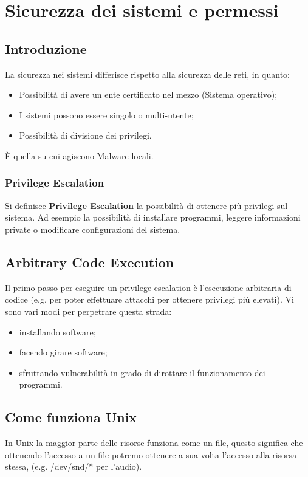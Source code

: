 \chapter{Sicurezza dei sistemi e permessi}

\section{Introduzione}
La sicurezza nei sistemi differisce rispetto alla sicurezza delle reti, in quanto:
\begin{itemize}
    \item Possibilità di avere un ente certificato nel mezzo (Sistema operativo);
    \item I sistemi possono essere singolo o multi-utente;
    \item Possibilità di divisione dei privilegi.
\end{itemize}
È quella su cui agiscono Malware locali.

\subsection{Privilege Escalation}
Si definisce \textbf{Privilege Escalation} la possibilità di ottenere più privilegi sul sistema.
Ad esempio la possibilità di installare programmi, leggere informazioni private o
modificare configurazioni del sistema.

\section{Arbitrary Code Execution}
Il primo passo per eseguire un privilege escalation è l'esecuzione arbitraria di codice (e.g. per poter effettuare attacchi per ottenere privilegi più elevati).
Vi sono vari modi per perpetrare questa strada:
\begin{itemize}
    \item installando software;
    \item facendo girare software;
    \item sfruttando vulnerabilità in grado di dirottare il funzionamento dei programmi.
\end{itemize}

\section{Come funziona Unix}
In Unix la maggior parte delle risorse funziona come un file, questo significa che ottenendo l'accesso a un file potremo ottenere a sua volta l'accesso alla risorsa stessa, (e.g. /dev/snd/* per l’audio).

